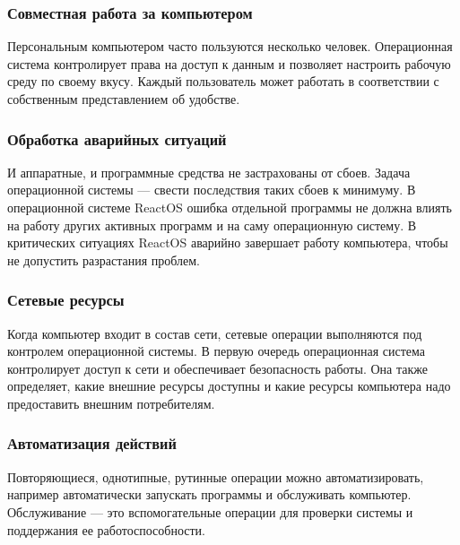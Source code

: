 \subsubsection{Совместная работа за компьютером}
Персональным компьютером часто пользуются несколько человек. Операционная система контролирует права на доступ к данным и позволяет настроить рабочую среду по своему вкусу. Каждый пользователь может работать в соответствии с собственным представлением об удобстве.
\subsubsection{Обработка аварийных ситуаций}
И аппаратные, и программные средства не застрахованы от сбоев. Задача операционной системы — свести последствия таких сбоев к минимуму. В операционной системе ReactOS ошибка отдельной программы не должна влиять на работу других активных программ и на саму операционную систему. В критических ситуациях ReactOS аварийно завершает работу компьютера, чтобы не допустить разрастания проблем.
\subsubsection{Сетевые ресурсы}
Когда компьютер входит в состав сети, сетевые операции выполняются под контролем операционной системы. В первую очередь операционная система контролирует доступ к сети и обеспечивает безопасность работы. Она также определяет, какие внешние ресурсы доступны и какие ресурсы компьютера надо предоставить внешним потребителям.
\subsubsection{Автоматизация действий}
Повторяющиеся, однотипные, рутинные операции можно автоматизировать, например автоматически запускать программы и обслуживать компьютер. Обслуживание — это вспомогательные операции для проверки системы и поддержания ее работоспособности.

